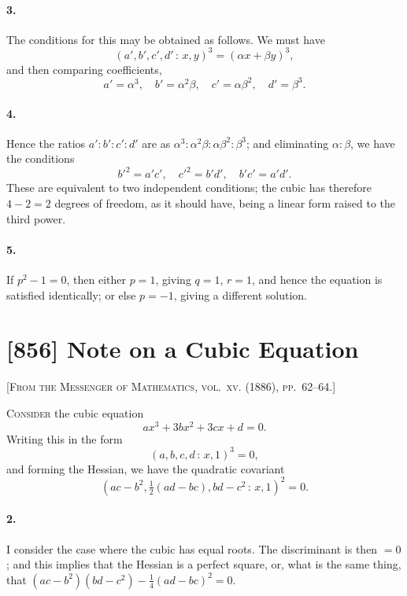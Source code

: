 \documentclass[11pt,a4paper]{article}
\theoremstyle{definition}
\begin{document}
\paragraph{3.} The conditions for this may be obtained as follows. We must have
\[
(a', b', c', d'\,\colon\,x, y)^{3} = (\alpha x + \beta y)^{3},
\]
and then comparing coefficients,
\[
a' = \alpha^{3}, \quad b' = \alpha^{2}\beta, \quad c' = \alpha\beta^{2}, \quad d' = \beta^{3}.
\]

\paragraph{4.} Hence the ratios $a' : b' : c' : d'$ are as $\alpha^{3} : \alpha^{2}\beta : \alpha\beta^{2} : \beta^{3}$; and eliminating $\alpha : \beta$, we have the conditions
\[
b'^{2} = a'c', \quad c'^{2} = b'd', \quad b'c' = a'd'.
\]
These are equivalent to two independent conditions; the cubic has therefore $4 - 2 = 2$ degrees of freedom, as it should have, being a linear form raised to the third power.

\paragraph{5.} If $p^{2} - 1 = 0$, then either $p = 1$, giving $q = 1$, $r = 1$, and hence the equation is satisfied identically; or else $p = -1$, giving a different solution.

\newpage
\section*{[856] Note on a Cubic Equation}

\noindent\textsc{[From the Messenger of Mathematics, vol.~xv. (1886), pp.~62--64.]}

\smallskip

\noindent\textsc{Consider} the cubic equation
\[
ax^{3} + 3bx^{2} + 3cx + d = 0.
\]
Writing this in the form
\[
(a, b, c, d\,\colon\,x, 1)^{3} = 0,
\]
and forming the Hessian, we have the quadratic covariant
\[
(ac - b^{2}, \tfrac{1}{2}(ad - bc), bd - c^{2}\,\colon\,x, 1)^{2} = 0.
\]

\paragraph{2.} I consider the case where the cubic has equal roots. The discriminant is then $= 0$; and this implies that the Hessian is a perfect square, or, what is the same thing, that $(ac - b^{2})(bd - c^{2}) - \frac{1}{4}(ad - bc)^{2} = 0$.
\end{document}
